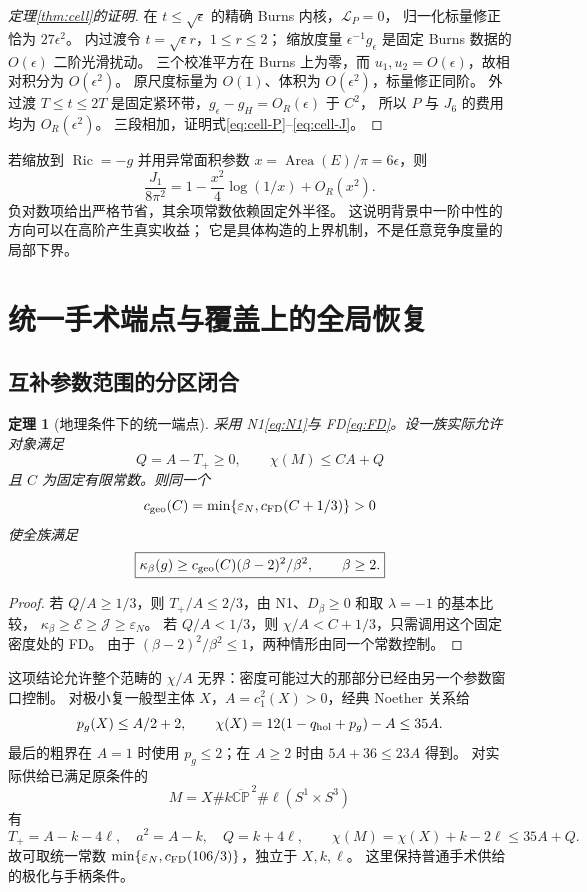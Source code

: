 \documentclass[UTF8,11pt,a4paper,fontset=none]{ctexart}
\numberwithin{equation}{section}
\newtheorem{theorem}{定理}[section]
\theoremstyle{definition}
\theoremstyle{remark}\newtheorem{remark}[theorem]{说明}
\newcommand{\Ric}{\operatorname{Ric}}
\newcommand{\CP}{\mathbb{CP}}
\newcommand{\Ecal}{\mathcal E}
\newcommand{\Jcal}{\mathcal J}
\begin{document}
\begin{proof}[定理\ref{thm:cell}的证明]
在 $t\le\sqrt\epsilon$ 的精确 Burns 内核，$\mathscr L_P=0$，
归一化标量修正恰为 $27\epsilon^2$。
内过渡令 $t=\sqrt\epsilon r$，$1\le r\le2$；
缩放度量 $\epsilon^{-1}g_\epsilon$ 是固定 Burns 数据的 $O(\epsilon)$ 二阶光滑扰动。
三个校准平方在 Burns 上为零，而 $u_1,u_2=O(\epsilon)$，故相对积分为 $O(\epsilon^2)$。
原尺度标量为 $O(1)$、体积为 $O(\epsilon^2)$，标量修正同阶。
外过渡 $T\le t\le2T$ 是固定紧环带，$g_\epsilon-g_H=O_R(\epsilon)$ 于 $C^2$，
所以 $P$ 与 $J_6$ 的费用均为 $O_R(\epsilon^2)$。
三段相加，证明式\eqref{eq:cell-P}--\eqref{eq:cell-J}。
\end{proof}

若缩放到 $\Ric=-g$ 并用异常面积参数 $x=\operatorname{Area}(E)/\pi=6\epsilon$，则
\[
\frac{J_1}{8\pi^2}=1-\frac{x^2}{4}\log(1/x)+O_R(x^2).
\]
负对数项给出严格节省，其余项常数依赖固定外半径。
这说明背景中一阶中性的方向可以在高阶产生真实收益；
它是具体构造的上界机制，不是任意竞争度量的局部下界。

\section{统一手术端点与覆盖上的全局恢复}\label{sec:global}

\subsection{互补参数范围的分区闭合}
\begin{theorem}[地理条件下的统一端点]\label{thm:geography}
采用 N1\eqref{eq:N1}与 FD\eqref{eq:FD}。设一族实际允许对象满足
\[
Q=A-T_+\ge0,\qquad \chi(M)\le CA+Q
\]
且 $C$ 为固定有限常数。则同一个
\[
c_{\rm geo}(C)=\min\{\varepsilon_N,c_{\rm FD}(C+1/3)\}>0
\]
使全族满足
\begin{equation}\label{eq:geography}
\boxed{\kappa_\beta(g)\ge c_{\rm geo}(C)(\beta-2)^2/\beta^2,\qquad\beta\ge2.}
\end{equation}
\end{theorem}
\begin{proof}
若 $Q/A\ge1/3$，则 $T_+/A\le2/3$，由 N1、$D_\beta\ge0$ 和取 $\lambda=-1$ 的基本比较，
$\kappa_\beta\ge\Ecal\ge\Jcal\ge\varepsilon_N$。
若 $Q/A<1/3$，则 $\chi/A<C+1/3$，只需调用这个固定密度处的 FD。
由于 $(\beta-2)^2/\beta^2\le1$，两种情形由同一个常数控制。
\end{proof}

这项结论允许整个范畴的 $\chi/A$ 无界：密度可能过大的那部分已经由另一个参数窗口控制。
对极小复一般型主体 $X$，$A=c_1^2(X)>0$，经典 Noether 关系给
\[
p_g(X)\le A/2+2,\qquad
\chi(X)=12(1-q_{\rm hol}+p_g)-A\le35A.
\]
最后的粗界在 $A=1$ 时使用 $p_g\le2$；在 $A\ge2$ 时由 $5A+36\le23A$ 得到\cite{Noether}。
对实际供给已满足原条件的
\[
M=X\#k\overline{\CP}^{\,2}\#\ell(S^1\times S^3)
\]
有
\[
T_+=A-k-4\ell,\quad a^2=A-k,\quad Q=k+4\ell,
\qquad \chi(M)=\chi(X)+k-2\ell\le35A+Q.
\]
故可取统一常数 $\min\{\varepsilon_N,c_{\rm FD}(106/3)\}$，独立于 $X,k,\ell$。
这里保持普通手术供给的极化与手柄条件\cite{LeBrunRicci}。
\end{document}
